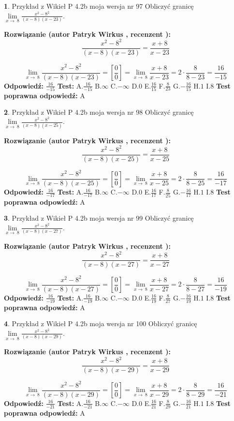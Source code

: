 \documentclass[12pt, a4paper]{article}
\theoremstyle{definition} %
\newtheorem{zad}{}
\newcommand{\zadStart}[1]{\begin{zad}#1\newline}
\newcommand{\zadStop}{\end{zad}}
\newcommand{\rozwStart}[2]{\noindent \textbf{Rozwiązanie (autor #1 , recenzent #2): }\newline}
\newcommand{\rozwStop}{\newline}
\newcommand{\odpStart}{\noindent \textbf{Odpowiedź:}\newline}
\newcommand{\odpStop}{\newline}
\newcommand{\testStart}{\noindent \textbf{Test:}\newline}
\newcommand{\testStop}{\newline}
\newcommand{\kluczStart}{\noindent \textbf{Test poprawna odpowiedź:}\newline}
\newcommand{\kluczStop}{\newline}
\begin{document}
\zadStart{Przykład z Wikieł P 4.2b moja wersja nr 97}
Obliczyć granicę $\lim\limits_{x\to\ 8}\frac{x^{2}-8^{2}}{(x-8)(x-23)}$.
\zadStop
\rozwStart{Patryk Wirkus}{}
$$\frac{x^{2}-8^{2}}{(x-8)(x-23)}=\frac{x+8}{x-23}$$

$$\lim\limits_{x\to\ 8}\frac{x^{2}-8^{2}}{(x-8)(x-23)}=[\frac{0}{0}]=\lim\limits_{x\to\ 8}\frac{x+8}{x-23}=2 \cdot \frac{8}{8-23} = \frac{16}{-15}$$
\rozwStop
\odpStart
$\frac{16}{-15}$
\odpStop
\testStart
A.$\frac{16}{-15}$
B.$\infty$
C.$-\infty$
D.$0$
E.$\frac{16}{15}$
F.$\frac{8}{23}$
G.$-\frac{16}{15}$
H.$1$
I.$8$
\testStop
\kluczStart
A
\kluczStop



\zadStart{Przykład z Wikieł P 4.2b moja wersja nr 98}
Obliczyć granicę $\lim\limits_{x\to\ 8}\frac{x^{2}-8^{2}}{(x-8)(x-25)}$.
\zadStop
\rozwStart{Patryk Wirkus}{}
$$\frac{x^{2}-8^{2}}{(x-8)(x-25)}=\frac{x+8}{x-25}$$

$$\lim\limits_{x\to\ 8}\frac{x^{2}-8^{2}}{(x-8)(x-25)}=[\frac{0}{0}]=\lim\limits_{x\to\ 8}\frac{x+8}{x-25}=2 \cdot \frac{8}{8-25} = \frac{16}{-17}$$
\rozwStop
\odpStart
$\frac{16}{-17}$
\odpStop
\testStart
A.$\frac{16}{-17}$
B.$\infty$
C.$-\infty$
D.$0$
E.$\frac{16}{17}$
F.$\frac{8}{25}$
G.$-\frac{16}{17}$
H.$1$
I.$8$
\testStop
\kluczStart
A
\kluczStop



\zadStart{Przykład z Wikieł P 4.2b moja wersja nr 99}
Obliczyć granicę $\lim\limits_{x\to\ 8}\frac{x^{2}-8^{2}}{(x-8)(x-27)}$.
\zadStop
\rozwStart{Patryk Wirkus}{}
$$\frac{x^{2}-8^{2}}{(x-8)(x-27)}=\frac{x+8}{x-27}$$

$$\lim\limits_{x\to\ 8}\frac{x^{2}-8^{2}}{(x-8)(x-27)}=[\frac{0}{0}]=\lim\limits_{x\to\ 8}\frac{x+8}{x-27}=2 \cdot \frac{8}{8-27} = \frac{16}{-19}$$
\rozwStop
\odpStart
$\frac{16}{-19}$
\odpStop
\testStart
A.$\frac{16}{-19}$
B.$\infty$
C.$-\infty$
D.$0$
E.$\frac{16}{19}$
F.$\frac{8}{27}$
G.$-\frac{16}{19}$
H.$1$
I.$8$
\testStop
\kluczStart
A
\kluczStop



\zadStart{Przykład z Wikieł P 4.2b moja wersja nr 100}
Obliczyć granicę $\lim\limits_{x\to\ 8}\frac{x^{2}-8^{2}}{(x-8)(x-29)}$.
\zadStop
\rozwStart{Patryk Wirkus}{}
$$\frac{x^{2}-8^{2}}{(x-8)(x-29)}=\frac{x+8}{x-29}$$

$$\lim\limits_{x\to\ 8}\frac{x^{2}-8^{2}}{(x-8)(x-29)}=[\frac{0}{0}]=\lim\limits_{x\to\ 8}\frac{x+8}{x-29}=2 \cdot \frac{8}{8-29} = \frac{16}{-21}$$
\rozwStop
\odpStart
$\frac{16}{-21}$
\odpStop
\testStart
A.$\frac{16}{-21}$
B.$\infty$
C.$-\infty$
D.$0$
E.$\frac{16}{21}$
F.$\frac{8}{29}$
G.$-\frac{16}{21}$
H.$1$
I.$8$
\testStop
\kluczStart
A
\kluczStop
\end{document}
